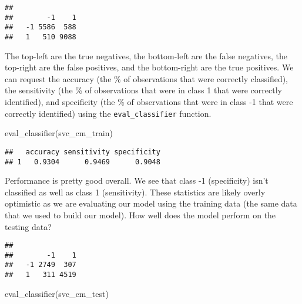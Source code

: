 \documentclass[
]{book}
\newenvironment{Shaded}{\begin{snugshade}}{\end{snugshade}}
\newcommand{\AttributeTok}[1]{\textcolor[rgb]{0.77,0.63,0.00}{#1}}
\newcommand{\FunctionTok}[1]{\textcolor[rgb]{0.00,0.00,0.00}{#1}}
\newcommand{\NormalTok}[1]{#1}
\newcommand{\OtherTok}[1]{\textcolor[rgb]{0.56,0.35,0.01}{#1}}
\newcommand{\SpecialCharTok}[1]{\textcolor[rgb]{0.00,0.00,0.00}{#1}}
\begin{document}
\begin{verbatim}
##     
##        -1    1
##   -1 5586  588
##   1   510 9088
\end{verbatim}

The top-left are the true negatives, the bottom-left are the false negatives, the top-right are the false positives, and the bottom-right are the true positives. We can request the accuracy (the \% of observations that were correctly classified), the sensitivity (the \% of observations that were in class 1 that were correctly identified), and specificity (the \% of observations that were in class -1 that were correctly identified) using the \texttt{eval\_classifier} function.

\begin{Shaded}
\begin{Highlighting}[]
\FunctionTok{eval\_classifier}\NormalTok{(svc\_cm\_train)}
\end{Highlighting}
\end{Shaded}

\begin{verbatim}
##   accuracy sensitivity specificity
## 1   0.9304      0.9469      0.9048
\end{verbatim}

Performance is pretty good overall. We see that class -1 (specificity) isn't classified as well as class 1 (sensitivity). These statistics are likely overly optimistic as we are evaluating our model using the training data (the same data that we used to build our model). How well does the model perform on the testing data?

\begin{Shaded}
\end{Shaded}

\begin{verbatim}
##     
##        -1    1
##   -1 2749  307
##   1   311 4519
\end{verbatim}

\begin{Shaded}
\begin{Highlighting}[]
\FunctionTok{eval\_classifier}\NormalTok{(svc\_cm\_test)}
\end{Highlighting}
\end{Shaded}
\end{document}
